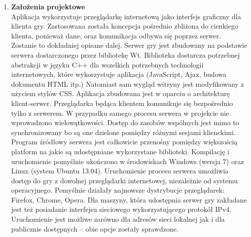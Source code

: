 \documentclass{report}
\begin{document}
\begin{enumerate}
\item \textbf{ Założenia projektowe}	\\
Aplikacja wykorzystuje przeglądarkę internetową jako interfejs graficzny dla klienta gry. Zastosowana została koncepcja pośrednio zbliżona do cienkiego klienta, ponieważ dane, oraz komunikacja odbywa się poprzez serwer. Zostanie to dokładniej opisane dalej. 
Serwer gry jest zbudowany na podstawie serwera dostarczonego przez bibliotekę Wt. Biblioteka dostarcza potrzebnej abstrakcji w języku C++ dla wszelkich potrzebnych technologii internetowych, które wykorzystuje aplikacja (JavaScript, Ajax, budowa dokumentu HTML itp.) Natomiast sam wygląd witryny jest modyfikowany z użyciem stylów CSS.
Aplikacja zbudowana jest w oparciu o architekturę klient-serwer. Przeglądarka będąca klientem komunikuje się bezpośrednio tylko z serwerem. W przypadku samego procesu serwera w projekcie nie wprowadzono wielowątkowości. Dostęp do zasobów wspólnych jest mimo to synchronizowany bo są one dzielone pomiędzy różnymi sesjami klienckimi.
Program źródłowy serwera jest całkowicie przenośny pomiędzy większością platform na jakie są udostępniane wykorzystane biblioteki. Kompilację i uruchomienie pomyślnie ukończono w środowiskach Windows (wersja 7) oraz Linux (system Ubuntu 13.04). Uruchomienie procesu serwera umożliwia dostęp do gry z dowolnej przeglądarki internetowej, niezależnie od systemu operacyjnego. Pomyślnie działały najnowsze dystrybucje przeglądarek: Firefox, Chrome, Opera.
Dla maszyny, która udostępnia serwer gry zakładane jest też posiadanie interfejsu sieciowego wykorzystującego protokół IPv4. Uruchomienie jest możliwe zarówno dla adresów sieci lokalnej jak i dla publicznie dostępnych – obie opcje zostały sprawdzone.


\end{enumerate}
\end{document}
